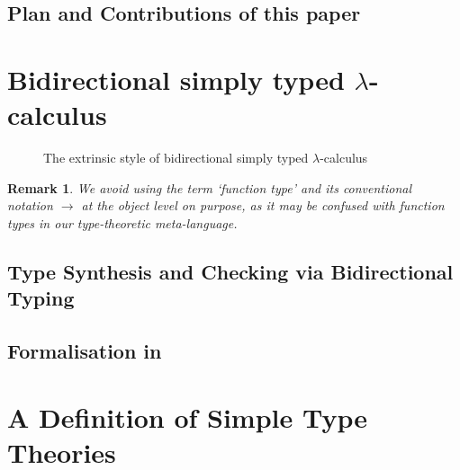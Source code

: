 \documentclass[acmsmall]{acmart}
\theoremstyle{acmdefinition}
\newtheorem{remark}[theorem]{Remark}}
\begin{document}
\subsection{Plan and Contributions of this paper}

\section{Bidirectional simply typed \texorpdfstring{$\lambda$}{lambda}-calculus}\label{sec:bi-stlc}
\begin{figure}
  \caption{The extrinsic style of bidirectional simply typed $\lambda$-calculus}
  \label{fig:bi-stlc}
\end{figure}
\begin{remark}
  We avoid using the term `function type' and its conventional notation $\to$ at the object level on purpose, as it may be confused with function types in our type-theoretic meta-language.
\end{remark}

\subsection{Type Synthesis and Checking via Bidirectional Typing}
\subsection{Formalisation in \Agda}

\section{A Definition of Simple Type Theories}\label{sec:simple-type-theories}
\end{document}
